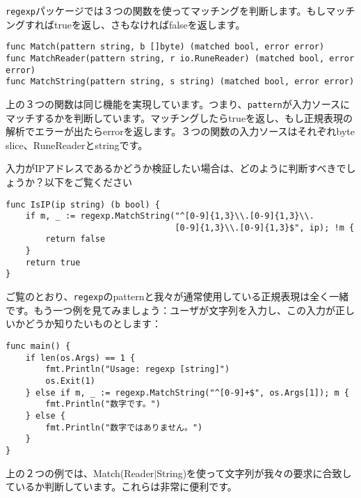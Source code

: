 \texttt{regexp}パッケージでは３つの関数を使ってマッチングを判断します。もしマッチングすればtrueを返し、さもなければfalseを返します。

\begin{lstlisting}[numbers=none]
func Match(pattern string, b []byte) (matched bool, error error)
func MatchReader(pattern string, r io.RuneReader) (matched bool, error error)
func MatchString(pattern string, s string) (matched bool, error error)
\end{lstlisting}

上の３つの関数は同じ機能を実現しています。つまり、\texttt{pattern}が入力ソースにマッチするかを判断しています。マッチングしたらtrueを返し、もし正規表現の解析でエラーが出たらerrorを返します。３つの関数の入力ソースはそれぞれbyte slice、RuneReaderとstringです。

入力がIPアドレスであるかどうか検証したい場合は、どのように判断すべきでしょうか？以下をご覧ください

\begin{lstlisting}[numbers=none]
func IsIP(ip string) (b bool) {
    if m, _ := regexp.MatchString("^[0-9]{1,3}\\.[0-9]{1,3}\\.
                                  [0-9]{1,3}\\.[0-9]{1,3}$", ip); !m {
        return false
    }
    return true
}
\end{lstlisting}

ご覧のとおり、\texttt{regexp}のpatternと我々が通常使用している正規表現は全く一緒です。もう一つ例を見てみましょう：ユーザが文字列を入力し、この入力が正しいかどうか知りたいものとします：



\begin{lstlisting}[numbers=none]
func main() {
    if len(os.Args) == 1 {
        fmt.Println("Usage: regexp [string]")
        os.Exit(1)
    } else if m, _ := regexp.MatchString("^[0-9]+$", os.Args[1]); m {
        fmt.Println("数字です。")
    } else {
        fmt.Println("数字ではありません。")
    }
}
\end{lstlisting}

上の２つの例では、Match(Reader$|$String)を使って文字列が我々の要求に合致しているか判断しています。これらは非常に便利です。

